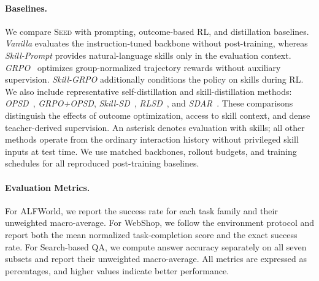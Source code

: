 \paragraph{Baselines.}
We compare \textsc{Seed} with prompting, outcome-based RL, and distillation baselines. \textit{Vanilla} evaluates the instruction-tuned backbone without post-training, whereas \textit{Skill-Prompt} provides natural-language skills only in the evaluation context. \textit{GRPO}~\citep{shao2024deepseekmath} optimizes group-normalized trajectory rewards without auxiliary supervision. \textit{Skill-GRPO} additionally conditions the policy on skills during RL. We also include representative self-distillation and skill-distillation methods: \textit{OPSD}~\citep{zhao2026selfdistilledreasoner}, \textit{GRPO+OPSD}, \textit{Skill-SD}~\citep{wang2026skillsd}, \textit{RLSD}~\citep{yang2026rlsd}, and \textit{SDAR}~\citep{lu2026sdar}. These comparisons distinguish the effects of outcome optimization, access to skill context, and dense teacher-derived supervision. An asterisk denotes evaluation with skills; all other methods operate from the ordinary interaction history without privileged skill inputs at test time. We use matched backbones, rollout budgets, and training schedules for all reproduced post-training baselines.

\vspace{-0.08in}



\paragraph{Evaluation Metrics.}
For ALFWorld, we report the success rate for each task family and their unweighted macro-average. For WebShop, we follow the environment protocol and report both the mean normalized task-completion score and the exact success rate. For Search-based QA, we compute answer accuracy separately on all seven subsets and report their unweighted macro-average. All metrics are expressed as percentages, and higher values indicate better performance.
\vspace{-0.08in}

